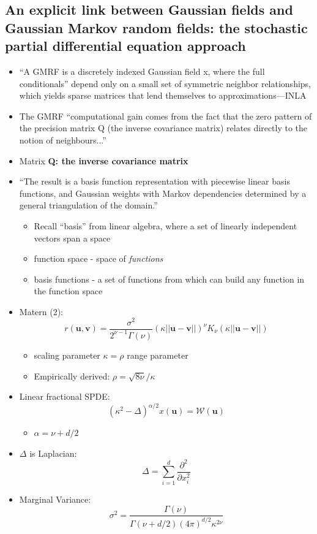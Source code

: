 \documentclass{article}
\begin{document}
\subsection*{An explicit link between Gaussian fields and Gaussian Markov random fields: the stochastic partial differential equation approach \citep{Lindgren2011}}
\begin{itemize}
\item ``A GMRF is a discretely indexed Gaussian field x, where the full conditionals'' depend only on a small set of symmetric neighbor relationships, which yields sparse matrices that lend themselves to approximations---INLA
\item The GMRF ``computational gain comes from the fact that the zero pattern of the precision matrix Q (the inverse covariance matrix) relates directly to the notion of neighbours...''
\item Matrix {\bf Q: the inverse covariance matrix}
\item ``The result is a basis function representation with piecewise linear basis functions, and Gaussian weights with Markov dependencies determined by a general triangulation of the domain.'' \citep{Lindgren2011}
  \begin{itemize}
  \item Recall ``basis'' from linear algebra, where a set of linearly independent vectors span a space
  \item function space - space of {\it functions}
  \item basis functions - a set of functions from which can build any function in the function space
  \end{itemize}

\item Matern (2):
$$r(\pmb{u}, \pmb{v}) = \frac{\sigma^{2}}{2^{\nu - 1}\Gamma(\nu)}(\kappa||\pmb{u} - \pmb{v}||)^{\nu}K_{\nu}(\kappa||\pmb{u} - \pmb{v}||)$$
      \begin{itemize}
      \item scaling parameter $\kappa = \rho$ range parameter
      \item Empirically derived: $\rho = \sqrt{8\nu}/\kappa$
      \end{itemize}
\item Linear fractional SPDE:
$$ (\kappa^{2} - \Delta)^{\alpha/2} x(\pmb{u}) = \mathcal{W}(\pmb{u}) $$
      \begin{itemize}
      \item $\alpha = \nu + d/2$
      \end{itemize}
\item $\Delta$ is Laplacian:
$$ \Delta = \sum_{i=1}^{d} \frac{\partial^{2}}{\partial x_{i}^{2}} $$
\item Marginal Variance:
$$\sigma^{2} = \frac{\Gamma(\nu)}{\Gamma(\nu + d/2)(4\pi)^{d/2}\kappa^{2\nu}}$$
\end{itemize}
\end{document}
